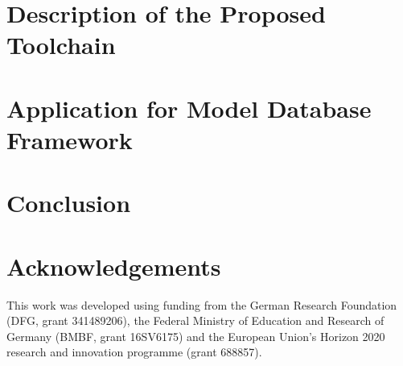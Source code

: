 \documentclass[runningheads]{llncs}
\begin{document}
\section{Description of the Proposed Toolchain}

\section{Application for Model Database Framework}


\section{Conclusion}

\section*{Acknowledgements}

This work was developed using funding from the German Research Foundation (DFG, grant 341489206), the Federal Ministry of Education and Research of Germany (BMBF, grant 16SV6175) and the European Union's Horizon 2020 research and innovation programme (grant 688857).



\end{document}
